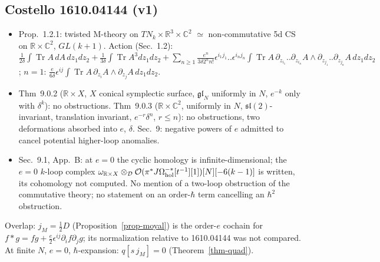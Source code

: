 \documentclass[10pt,a4paper]{article}
\numberwithin{equation}{section}
\theoremstyle{definition}
\theoremstyle{remark}
\newcommand{\Tr}{\operatorname{Tr}}
\newcommand{\fsl}{\mathfrak{sl}}
\newcommand{\fgl}{\mathfrak{gl}}
\begin{document}
\subsection{Costello 1610.04144 (v1)}
\begin{itemize}\itemsep1pt
\item Prop.~1.2.1: twisted M-theory on $TN_k\times\mathbb R^3\times\mathbb C^2$ $\simeq$ non-commutative 5d CS on $\mathbb R\times\mathbb C^2$, $GL(k+1)$. Action (Sec.~1.2): $\frac1{2\delta}\int\Tr A\,dA\,dz_1dz_2+\frac1{3\delta}\int\Tr A^3dz_1dz_2+\sum_{n\ge1}\frac{e^n}{3\delta2^nn!}\epsilon^{i_1j_1}..\epsilon^{i_nj_n}\int\Tr A\,\partial_{z_{i_1}}..\partial_{z_{i_n}}A\wedge\partial_{z_{j_1}}..\partial_{z_{j_n}}A\,dz_1dz_2$; $n=1$: $\frac{e}{6\delta}\epsilon^{ij}\int\Tr A\,\partial_{z_i}A\wedge\partial_{z_j}A\,dz_1dz_2$.
\item Thm~9.0.2 ($\mathbb R\times X$, $X$ conical symplectic surface, $\fgl_N$ uniformly in $N$, $e^{-k}$ only with $\delta^k$): no obstructions. Thm~9.0.3 ($\mathbb R\times\mathbb C^2$, uniformly in $N$, $\fsl(2)$-invariant, translation invariant, $e^{-r}\delta^n$, $r\le n$): no obstructions, two deformations absorbed into $e$, $\delta$. Sec.~9: negative powers of $e$ admitted to cancel potential higher-loop anomalies.
\item Sec.~9.1, App.~B: at $e=0$ the cyclic homology is infinite-dimensional; the $e=0$ $k$-loop complex $\omega_{\mathbb R\times X}\otimes_{\mathcal D}\mathcal O(\pi^*J\Omega^{-*}_{\rm hol}[t^{-1}][1])[N][-6(k-1)]$ is written, its cohomology not computed. No mention of a two-loop obstruction of the commutative theory; no statement on an order-$\hbar$ term cancelling an $\hbar^2$ obstruction.
\end{itemize}
Overlap: $j_M=\frac12D$ (Proposition~\ref{prop-moyal}) is the order-$e$ cochain for $f*g=fg+\frac e2\epsilon^{ij}\partial_if\partial_jg$; its normalization relative to 1610.04144 was not compared. At finite $N$, $e=0$, $\hbar$-expansion: $q[s\,j_M]=0$ (Theorem~\ref{thm-quad}).
\end{document}
